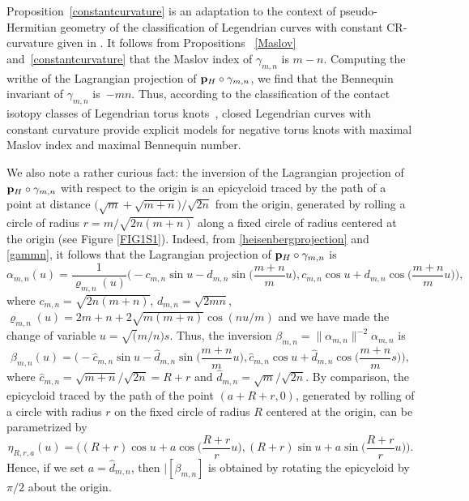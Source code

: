 \documentclass[10pt,a4paper]{amsart}
\def\gam{\gamma} %
\newcommand\bp{{\bf p}}
\newcommand\bph{{\bp_H}} %
\numberwithin{equation}{section}
\begin{document}
\begin{Remark}
Proposition~\ref{constantcurvature} is an adaptation to the context of pseudo-Hermitian geometry of the classification of Legendrian curves with constant CR-curvature given in \cite{MS}. It follows from Propositions ~\ref{Maslov} and~\ref{constantcurvature} that the Maslov index of $\gam_{m,n}$ is $m-n$.
Computing the writhe of the Lagrangian projection of $\bph \circ \gam_{m,n}$,
we find that the Bennequin invariant of $\gam_{m,n}$ is~$-mn$. Thus, according to the classification of the contact isotopy classes of Legendrian torus knots~\cite{EH}, closed Legendrian curves with constant curvature provide explicit models for negative torus knots with maximal Maslov index and maximal Bennequin number.
\end{Remark}

\begin{Remark}
We also note a rather curious fact: the inversion of the Lagrangian projection of $\bph\circ \gamma_{m,n}$ with respect to the origin is an epicycloid traced by the path of a point at distance $\bigl(\sqrt{m}+\sqrt{m+n}\bigr)/\sqrt{2n}$ from the origin, generated by rolling a circle of radius $r=m/\sqrt{2n(m+n)}$ along a fixed circle of radius  centered at the origin (see Figure \ref{FIG1S1}). Indeed, from \eqref{heisenbergprojection} and \eqref{gammn}, it follows that the Lagrangian projection of $\bph \circ \gam_{m,n}$ is
\[
\alpha_{m,n}(u)=\frac{1}{\varrho_{m,n}(u)}\biggl(-c_{m,n}\sin u-d_{m,n}\sin\biggl(\frac{m+n}{m}u\biggr),c_{m,n}\cos u+d_{m,n}\cos\biggl(\frac{m+n}{m}u\biggr)\biggr),
\]
where $c_{m,n}=\sqrt{2n(m+n)}$, $d_{m,n}=\sqrt{2m n}$, $\varrho_{m,n}(u)=2m+n+2\sqrt{m(m+n)}\cos(n u/m)$ and we have made the change of
variable $u=\sqrt(m/n)s$.
Thus, the inversion $\beta_{m,n}=\|\alpha_{m,n}\|^{-2}\alpha_{m,n}$ is
\[
\beta_{m,n}(u)=\biggl(-\hat{c}_{m,n}\sin u-\hat{d}_{m,n}\sin\biggl(\frac{m+n}{m}u\biggr),\hat{c}_{m,n}\cos u+\hat{d}_{m,n}\cos\biggl(\frac{m+n}{m}s\biggr)\biggr),
\]
where $\hat{c}_{m,n}=\sqrt{m+n}/\sqrt{2n}=R+r$ and $\hat{d}_{m,n}=\sqrt{m}/\sqrt{2n}$.
By comparison, the epicycloid traced by the path of the point $(a+R+r,0)$, generated by rolling of a circle with radius $r$ on the fixed circle of radius $R$ centered at the origin, can be parametrized by
\[
\eta_{R,r,a}(u)=\biggl((R+r)\cos u+a\cos\biggl(\frac{R+r}{r}u\biggr),(R+r)\sin u+a\sin\biggl(\frac{R+r}{r}u\biggr)\biggr).
\]
Hence, if we set $a=\hat{d}_{m,n}$, then $|[\beta_{m,n}]$ is obtained by rotating the epicycloid by $\pi/2$ about the origin.
\end{Remark}
\end{document}
